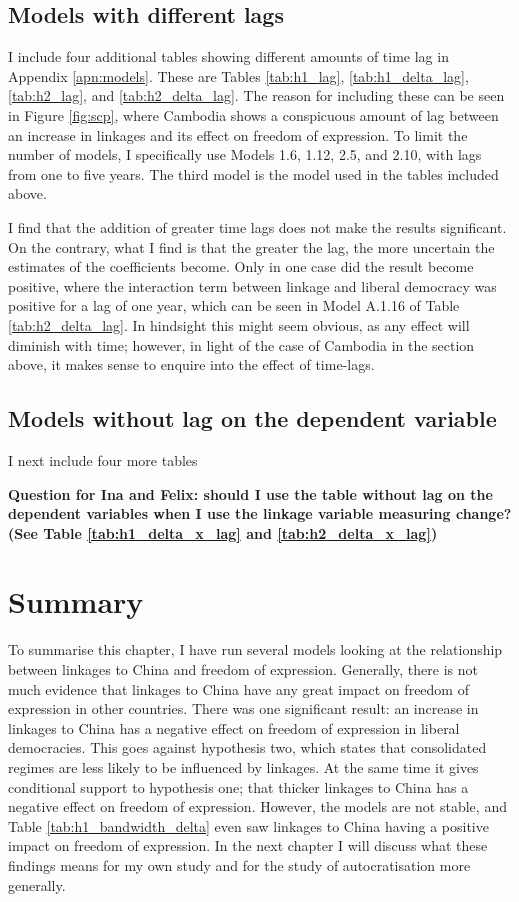 \subsection{Models with different lags}
I include four additional tables showing different amounts of time lag in Appendix \ref{apn:models}. These are Tables \ref{tab:h1_lag}, \ref{tab:h1_delta_lag}, \ref{tab:h2_lag}, and \ref{tab:h2_delta_lag}. The reason for including these can be seen in Figure \ref{fig:scp}, where Cambodia shows a conspicuous amount of lag between an increase in linkages and its effect on freedom of expression. To limit the number of models, I specifically use Models 1.6, 1.12, 2.5, and 2.10, with lags from one to five years. The third model is the model used in the tables included above. 

I find that the addition of greater time lags does not make the results significant. On the contrary, what I find is that the greater the lag, the more uncertain the estimates of the coefficients become. Only in one case did the result become positive, where the interaction term between linkage and liberal democracy was positive for a lag of one year, which can be seen in Model A.1.16 of Table \ref{tab:h2_delta_lag}. In hindsight this might seem obvious, as any effect will diminish with time; however, in light of the case of Cambodia in the section above, it makes sense to enquire into the effect of time-lags.

\subsection{Models without lag on the dependent variable}
I next include four more tables 

\textbf{Question for Ina and Felix: should I use the table without lag on the dependent variables when I use the linkage variable measuring change? (See Table \ref{tab:h1_delta_x_lag} and \ref{tab:h2_delta_x_lag})}

\section{Summary}
To summarise this chapter, I have run several models looking at the relationship between linkages to China and freedom of expression. Generally, there is not much evidence that linkages to China have any great impact on freedom of expression in other countries. There was one significant result: an increase in linkages to China has a negative effect on freedom of expression in liberal democracies. This goes against hypothesis two, which states that consolidated regimes are less likely to be influenced by linkages. At the same time it gives conditional support to hypothesis one; that thicker linkages to China has a negative effect on freedom of expression. However, the models are not stable, and Table \ref{tab:h1_bandwidth_delta} even saw linkages to China having a positive impact on freedom of expression. In the next chapter I will discuss what these findings means for my own study and for the study of autocratisation more generally.